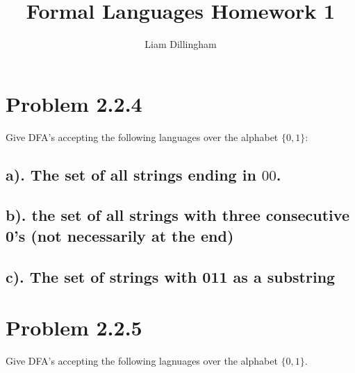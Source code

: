 \documentclass[20pt]{article} %
\title{Formal Languages Homework 1}
\author{Liam Dillingham}
\begin{document}
\maketitle

\section{Problem 2.2.4}
Give DFA's accepting the following languages over the alphabet $\{0,1\}$:
\subsection{a). The set of all strings ending in $00$.}
\begin{figure}[!htb]

\end{figure}
\subsection{b). the set of all strings with three consecutive 0's (not necessarily at the end)}

\subsection{c). The set of strings with 011 as a substring}

\section{Problem 2.2.5}
Give DFA's accepting the following lagnuages over the alphabet $\{0,1\}$.
\end{document}
